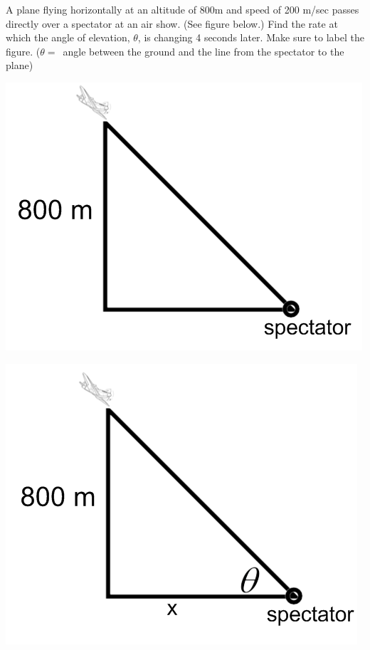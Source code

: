 \documentclass[nooutcomes]{ximera}
\begin{document}
\begin{problem}
A plane flying horizontally at an altitude of 800m and speed of 200 m/sec passes directly over a spectator at an air show. (See figure below.)  Find the rate at which the angle of elevation, $\theta$, is changing 4 seconds later. Make sure to label the figure. ($\theta =$\ angle between the ground and the line from the spectator to the plane)   

	\begin{image}
	\includegraphics[scale=.5]{Figure6.png}
	\end{image}
\begin{freeResponse} \hfil
	\begin{image}
	\includegraphics[scale=.5]{Figure7.png}
	\end{image}


\end{freeResponse}
\end{problem}
\end{document}
